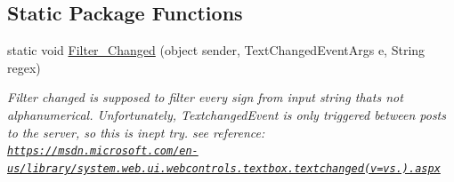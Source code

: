 \subsection*{Static Package Functions}
\begin{DoxyCompactItemize}
\item 
static void \hyperlink{class_listen_to_me_1_1_app_ac165e2cffa6fc662285627595a6a7622}{Filter\+\_\+\+Changed} (object sender, Text\+Changed\+Event\+Args e, String regex)
\begin{DoxyCompactList}\small\item\em Filter changed is supposed to filter every sign from input string that\textquotesingle{}s not alphanumerical. Unfortunately, Textchanged\+Event is only triggered between posts to the server, so this is inept try. see reference\+: \href{https://msdn.microsoft.com/en-us/library/system.web.ui.webcontrols.textbox.textchanged(v=vs.110).aspx}{\tt https\+://msdn.\+microsoft.\+com/en-\/us/library/system.\+web.\+ui.\+webcontrols.\+textbox.\+textchanged(v=vs.).\+aspx} \end{DoxyCompactList}\end{DoxyCompactItemize}
